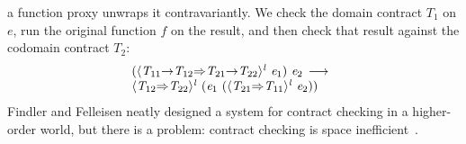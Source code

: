 \documentclass[9pt]{extarticle}
\newcommand{\ottnt}[1]{\mathit{#1}}
\begin{document}
a function proxy unwraps it contravariantly. We check the domain
contract $\ottnt{T_{{\mathrm{1}}}}$ on $\ottnt{e}$, run the original function $\mathit{f}$ on the
result, and then check that result against the codomain contract
$\ottnt{T_{{\mathrm{2}}}}$:
\[ \begin{array}{@{}l@{}}
    (  \langle   \ottnt{T_{{\mathrm{11}}}} \mathord{ \rightarrow } \ottnt{T_{{\mathrm{12}}}}   \mathord{ \overset{    }{\Rightarrow} }   \ottnt{T_{{\mathrm{21}}}} \mathord{ \rightarrow } \ottnt{T_{{\mathrm{22}}}}   \rangle^{ \ottnt{l} } ~  \ottnt{e_{{\mathrm{1}}}}  )  ~ \ottnt{e_{{\mathrm{2}}}}  \,  \longrightarrow _{    }  \, {} \\   \langle  \ottnt{T_{{\mathrm{12}}}}  \mathord{ \overset{    }{\Rightarrow} }  \ottnt{T_{{\mathrm{22}}}}  \rangle^{ \ottnt{l} } ~   (  \ottnt{e_{{\mathrm{1}}}} ~  (  \langle  \ottnt{T_{{\mathrm{21}}}}  \mathord{ \overset{    }{\Rightarrow} }  \ottnt{T_{{\mathrm{11}}}}  \rangle^{ \ottnt{l} } ~  \ottnt{e_{{\mathrm{2}}}}  )   )  
\end{array}
\]
Findler and Felleisen neatly designed a system for contract checking
in a higher-order world, but there is a problem: contract checking is space
inefficient~\cite{Herman07space}.
\end{document}
